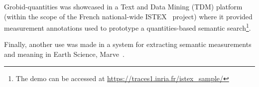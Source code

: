 Grobid-quantities was showcased in a Text and Data Mining (TDM) platform (within the scope of the French national-wide ISTEX~\cite{dazy2014istex} project) where it provided measurement annotations used to prototype a quantities-based semantic search\footnote{The demo can be accessed at \url{https://traces1.inria.fr/istex_sample/}}. 

Finally, another use was made in a system for extracting semantic measurements and meaning in Earth Science, Marve~\cite{hundman2017measurement}.  